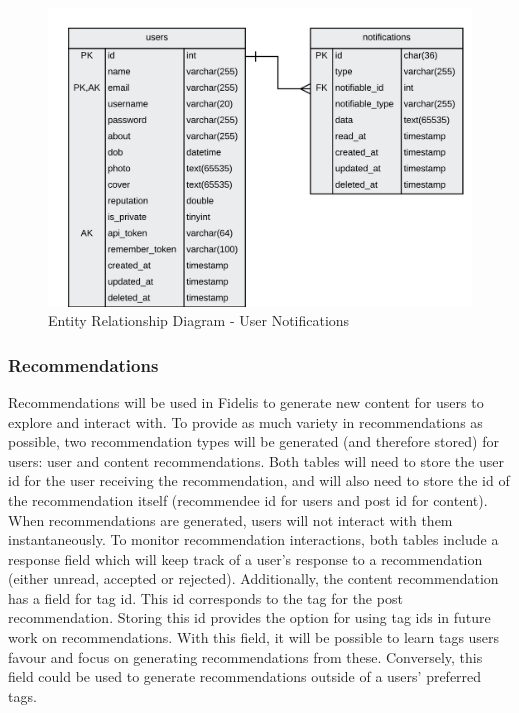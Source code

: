 \begin{figure}[H]
  \centering
  \includegraphics[width=1.0\textwidth]{Images/Design/Database/Notifications}
  \caption{Entity Relationship Diagram - User Notifications} \label{fig:ERD_Notifications}
\end{figure}

\subsubsection{Recommendations}
Recommendations will be used in Fidelis to generate new content for users to explore and interact with. To provide as much variety in recommendations as possible, two recommendation types will be generated (and therefore stored) for users: user and content recommendations. Both tables will need to store the user id for the user receiving the recommendation, and will also need to store the id of the recommendation itself (recommendee id for users and post id for content). When recommendations are generated, users will not interact with them instantaneously. To monitor recommendation interactions, both tables include a response field which will keep track of a user's response to a recommendation (either unread, accepted or rejected). Additionally, the content recommendation has a field for tag id. This id corresponds to the tag for the post recommendation. Storing this id provides the option for using tag ids in future work on recommendations. With this field, it will be possible to learn tags users favour and focus on generating recommendations from these. Conversely, this field could be used to generate recommendations outside of a users' preferred tags.

